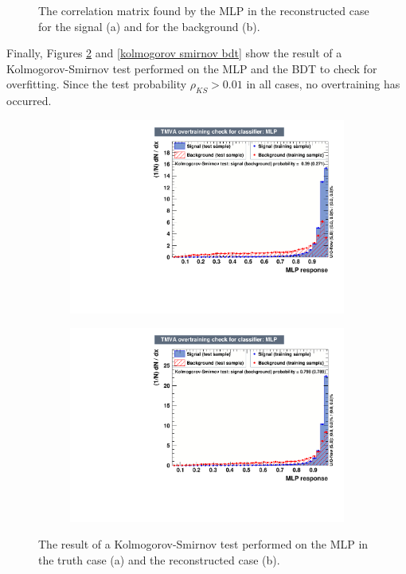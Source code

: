 \documentclass[10pt,a4paper]{book}
\begin{document}
\begin{figure}[h]
\begin{subfigure}{1.0\textwidth}
\caption{}
\end{subfigure}
\caption{The correlation matrix found by the MLP in the reconstructed case for the signal (a) and for the background (b).}
\label{correlation reco}
\end{figure} 

Finally, Figures \ref{kolmogorov smirnov mlp} and \ref{kolmogorov smirnov bdt} show the result of a Kolmogorov-Smirnov test \cite{10.2307/2280095} performed on the MLP and the BDT to check for overfitting. Since the test probability $\rho_{KS} > 0.01$ in all cases, no overtraining has occurred.

\begin{figure}[h]
\begin{subfigure}{0.8\textwidth}
\centering
\includegraphics[width=\textwidth]{ch4_images/ks_mlp_truth.pdf}
\caption{}
\end{subfigure}
\begin{subfigure}{0.8\textwidth}
\centering
\includegraphics[width=\textwidth]{ch4_images/ks_mlp_reco.pdf}
\caption{}
\end{subfigure}
\caption{The result of a Kolmogorov-Smirnov test performed on the MLP in the truth case (a) and the reconstructed case (b).}
\label{kolmogorov smirnov mlp}
\end{figure} 
\end{document}
